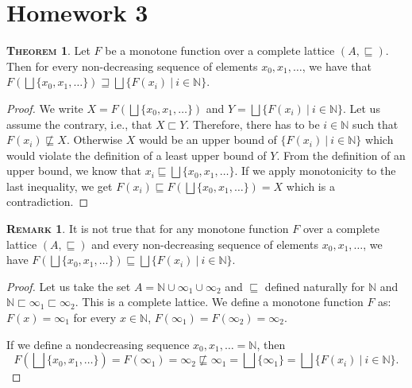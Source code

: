 \documentclass{article}
\theoremstyle{definition}
\newtheorem{theorem}[definition]{\scshape Theorem}
\newtheorem{remark}[definition]{\scshape Remark}
\begin{document}
\section*{Homework 3}

\begin{theorem}
    Let $F$ be a monotone function over a complete lattice $(A, \sqsubseteq)$. Then for every non-decreasing sequence of elements $x_0, x_1, \ldots$, we have that $F(\bigsqcup\{x_0, x_1, \ldots\}) \sqsupseteq \bigsqcup\{F(x_i) ~|~ i \in \mathbb{N}\}$.
\end{theorem}
\begin{proof}
    We write $X = F(\bigsqcup\{x_0, x_1, \ldots\})$ and $Y = \bigsqcup\{F(x_i) ~|~ i \in \mathbb{N}\}$. Let us assume the contrary, i.e., that $X \sqsubset Y$. Therefore, there has to be $i \in \mathbb{N}$ such that $F(x_i) \not\sqsubseteq X$. Otherwise $X$ would be an upper bound of $\{F(x_i) ~|~ i \in \mathbb{N}\}$ which would violate the definition of a least upper bound of $Y$. From the definition of an upper bound, we know that $x_i \sqsubseteq \bigsqcup\{x_0, x_1, \ldots\}$. If we apply monotonicity to the last inequality, we get $F(x_i) \sqsubseteq F(\bigsqcup\{x_0, x_1, \ldots\}) = X$ which is a contradiction.
\end{proof}

\begin{remark}
    It is not true that for any monotone function $F$ over a complete lattice $(A, \sqsubseteq)$ and every non-decreasing sequence of elements $x_0, x_1, \ldots$, we have $F(\bigsqcup\{x_0, x_1, \ldots\}) \sqsubseteq \bigsqcup\{F(x_i) ~|~ i \in \mathbb{N}\}$.
\end{remark}
\begin{proof}
    Let us take the set $A = \mathbb{N} \cup \infty_1 \cup \infty_2$ and $\sqsubseteq$ defined naturally for $\mathbb{N}$ and $\mathbb{N} \sqsubset \infty_1 \sqsubset \infty_2$. This is a complete lattice. We define a monotone function $F$ as: $F(x) = \infty_1$ for every $x \in \mathbb{N}$, $F(\infty_1) = F(\infty_2) = \infty_2$.

    If we define a nondecreasing sequence $x_0, x_1, \ldots = \mathbb{N}$, then $$F\left(\bigsqcup\{x_0, x_1, \ldots\}\right) = F(\infty_1) = \infty_2 \not\sqsubseteq \infty_1 = \bigsqcup \{\infty_1\} = \bigsqcup\{F(x_i) ~|~ i \in \mathbb{N}\}.$$
\end{proof}
\end{document}
